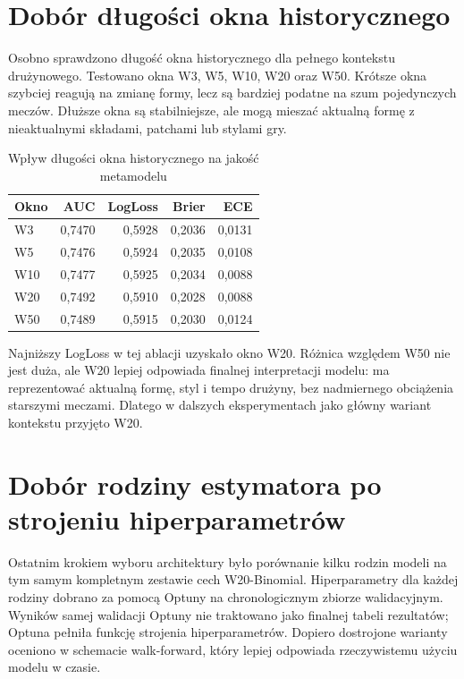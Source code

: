 \section{Dobór długości okna historycznego}

Osobno sprawdzono długość okna historycznego dla pełnego kontekstu drużynowego. Testowano okna W3,
W5, W10, W20 oraz W50. Krótsze okna szybciej reagują na zmianę formy, lecz są bardziej podatne na
szum pojedynczych meczów. Dłuższe okna są stabilniejsze, ale mogą mieszać aktualną formę z
nieaktualnymi składami, patchami lub stylami gry.

\begin{table}[H]
    \centering
    \caption{Wpływ długości okna historycznego na jakość metamodelu}
    \label{tab:metamodel_window_ablation}
    \begin{tabular}{lrrrr}
        \toprule
        Okno & AUC & LogLoss & Brier & ECE \\
        \midrule
        W3 & 0{,}7470 & 0{,}5928 & 0{,}2036 & 0{,}0131 \\
        W5 & 0{,}7476 & 0{,}5924 & 0{,}2035 & 0{,}0108 \\
        W10 & 0{,}7477 & 0{,}5925 & 0{,}2034 & 0{,}0088 \\
        W20 & 0{,}7492 & 0{,}5910 & 0{,}2028 & 0{,}0088 \\
        W50 & 0{,}7489 & 0{,}5915 & 0{,}2030 & 0{,}0124 \\
        \bottomrule
    \end{tabular}
\end{table}

Najniższy LogLoss w tej ablacji uzyskało okno W20. Różnica względem W50 nie jest duża, ale W20
lepiej odpowiada finalnej interpretacji modelu: ma reprezentować aktualną formę, styl i tempo
drużyny, bez nadmiernego obciążenia starszymi meczami. Dlatego w dalszych eksperymentach jako główny
wariant kontekstu przyjęto W20.

\section{Dobór rodziny estymatora po strojeniu hiperparametrów}

Ostatnim krokiem wyboru architektury było porównanie kilku rodzin modeli na tym samym kompletnym
zestawie cech W20-Binomial. Hiperparametry dla każdej rodziny dobrano za pomocą Optuny na
chronologicznym zbiorze walidacyjnym. Wyników samej walidacji Optuny nie traktowano jako finalnej
tabeli rezultatów; Optuna pełniła funkcję strojenia hiperparametrów. Dopiero dostrojone warianty
oceniono w schemacie walk-forward, który lepiej odpowiada rzeczywistemu użyciu modelu w czasie.

